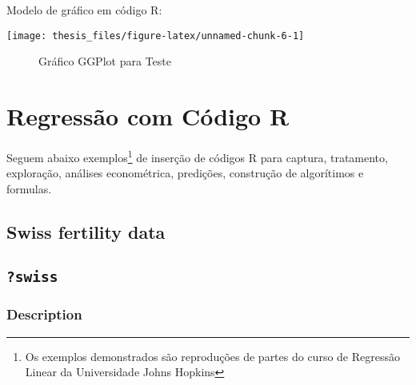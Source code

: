 \documentclass[12pt,]{04-class-files/abntex2}
\newenvironment{Shaded}{\begin{snugshade}}{\end{snugshade}}
\newcommand{\DataTypeTok}[1]{\textcolor[rgb]{0.13,0.29,0.53}{#1}}
\newcommand{\DecValTok}[1]{\textcolor[rgb]{0.00,0.00,0.81}{#1}}
\newcommand{\KeywordTok}[1]{\textcolor[rgb]{0.13,0.29,0.53}{\textbf{#1}}}
\newcommand{\NormalTok}[1]{#1}
\newcommand{\OperatorTok}[1]{\textcolor[rgb]{0.81,0.36,0.00}{\textbf{#1}}}
\newcommand{\StringTok}[1]{\textcolor[rgb]{0.31,0.60,0.02}{#1}}
\begin{document}
Modelo de gráfico em código R:

\begin{center}\texttt{[image: thesis\_files/figure-latex/unnamed-chunk-6-1]} \end{center}
\begin{figure}[!htb]
\centering
\caption{Gráfico GGPlot para Teste}
\label{fig:ggplot}
\end{figure}

\section{Regressão com Código R}

Seguem abaixo exemplos\footnote{Os exemplos demonstrados são reproduções de partes do curso de Regressão Linear da Universidade Johns Hopkins} de inserção de códigos R para captura, tratamento, exploração, análises econométrica, predições, construção de algorítimos e formulas.

\hypertarget{swiss-fertility-data}{%
\subsection{Swiss fertility data}\label{swiss-fertility-data}}

\begin{Shaded}
\end{Shaded}

\hypertarget{swiss}{%
\subsection{\texorpdfstring{\texttt{?swiss}}{?swiss}}\label{swiss}}

\hypertarget{description}{%
\subsubsection{Description}\label{description}}
\end{document}

